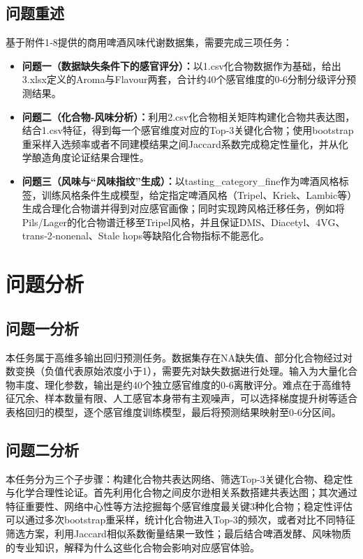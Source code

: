 \documentclass[12pt,a4paper]{article}
\begin{document}
\subsection{问题重述}
基于附件1‑8提供的商用啤酒风味代谢数据集，需要完成三项任务：
\begin{itemize}
    \item \textbf{问题一（数据缺失条件下的感官评分）：}以1.csv化合物数据作为基础，给出3.xlsx定义的Aroma与Flavour两套，合计约40个感官维度的0‑6分制分级评分预测结果。
    \item \textbf{问题二（化合物‑风味分析）：}利用2.csv化合物相关矩阵构建化合物共表达图，结合1.csv特征，得到每一个感官维度对应的Top‑3关键化合物；使用bootstrap重采样入选频率或者不同建模结果之间Jaccard系数完成稳定性量化，并从化学酿造角度论证结果合理性。
    \item \textbf{问题三（风味与“风味指纹”生成）：}以tasting\_category\_fine作为啤酒风格标签，训练风格条件生成模型，给定指定啤酒风格（Tripel、Kriek、Lambic等）生成合理化合物谱并得到对应感官画像；同时实现跨风格迁移任务，例如将Pils/Lager的化合物谱迁移至Tripel风格，并且保证DMS、Diacetyl、4VG、trans‑2‑nonenal、Stale hops等缺陷化合物指标不能恶化。
\end{itemize}
\section{问题分析}
\subsection{问题一分析}
本任务属于高维多输出回归预测任务。数据集存在NA缺失值、部分化合物经过对数变换（负值代表原始浓度小于1），需要先对缺失数据进行处理。输入为大量化合物丰度、理化参数，输出是约40个独立感官维度的0‑6离散评分。难点在于高维特征冗余、样本数量有限、人工感官本身带有主观噪声，可以选择梯度提升树等适合表格回归的模型，逐个感官维度训练模型，最后将预测结果映射至0‑6分区间。

\subsection{问题二分析}
本任务分为三个子步骤：构建化合物共表达网络、筛选Top‑3关键化合物、稳定性与化学合理性论证。首先利用化合物之间皮尔逊相关系数搭建共表达图；其次通过特征重要性、网络中心性等方法挖掘每个感官维度最关键3种化合物；稳定性评估可以通过多次bootstrap重采样，统计化合物进入Top‑3的频次，或者对比不同特征筛选方案，利用Jaccard相似系数衡量结果一致性；最后结合啤酒发酵、风味物质的专业知识，解释为什么这些化合物会影响对应感官体验。
\end{document}
